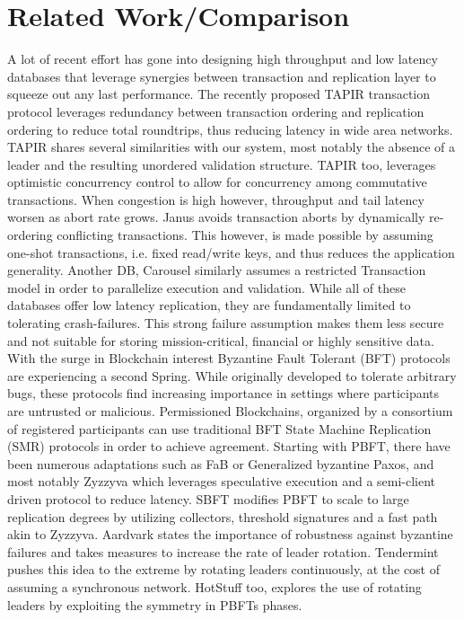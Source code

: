 \section{Related Work/Comparison}  
A lot of recent effort has gone into designing high throughput and low latency databases that leverage synergies between transaction and replication layer to squeeze out any last performance. The recently proposed TAPIR transaction protocol leverages redundancy between transaction ordering and replication ordering to reduce total roundtrips, thus reducing latency in wide area networks. TAPIR shares several similarities with our system, most notably the absence of a leader and the resulting unordered validation structure. TAPIR too, leverages optimistic concurrency control to allow for concurrency among commutative transactions. When congestion is high however, throughput and tail latency worsen as abort rate grows. Janus avoids transaction aborts by dynamically re-ordering conflicting transactions. This however, is made possible by assuming one-shot transactions, i.e. fixed read/write keys, and thus reduces the application generality. Another DB, Carousel similarly assumes a restricted Transaction model in order to parallelize execution and validation. While all of these databases offer low latency replication, they are fundamentally limited to tolerating crash-failures. This strong failure assumption makes them less secure and not suitable for storing mission-critical, financial or highly sensitive data. 
With the surge in Blockchain interest Byzantine Fault Tolerant (BFT) protocols are experiencing a second Spring. While originally developed to tolerate arbitrary bugs, these protocols find increasing importance in settings where participants are untrusted or malicious. Permissioned Blockchains, organized by a consortium of registered participants can use traditional BFT State Machine Replication (SMR) protocols in order to achieve agreement. Starting with PBFT, there have been numerous adaptations such as FaB or Generalized byzantine Paxos, and most notably Zyzzyva which leverages speculative execution and a semi-client driven protocol to reduce latency. SBFT modifies PBFT to scale to large replication degrees by utilizing collectors, threshold signatures and a fast path akin to Zyzzyva. Aardvark states the importance of robustness against byzantine failures and takes measures to increase the rate of leader rotation. Tendermint pushes this idea to the extreme by rotating leaders continuously, at the cost of assuming a synchronous network. HotStuff too, explores the use of rotating leaders by exploiting the symmetry in PBFTs phases. 

